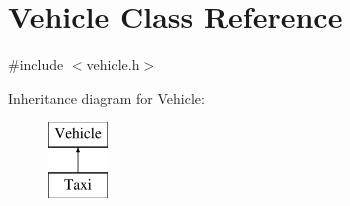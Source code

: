 \hypertarget{class_vehicle}{}\section{Vehicle Class Reference}
\label{class_vehicle}


{\ttfamily \#include $<$vehicle.\+h$>$}

Inheritance diagram for Vehicle\+:\begin{figure}[H]
\begin{center}
\leavevmode
\includegraphics[height=2.000000cm]{dd/df6/class_vehicle}
\end{center}
\end{figure}
